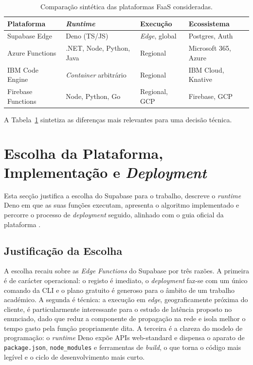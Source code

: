 \documentclass[conference]{IEEEtran}
\begin{document}
\begin{table}[!htbp]
\caption{Comparação sintética das plataformas FaaS consideradas.}
\label{tab:plat}
\centering
\renewcommand{\arraystretch}{1.18}
\footnotesize
\begin{tabular}{@{}p{2.2cm}p{1.9cm}p{1.7cm}p{1.5cm}@{}}
\toprule
\textbf{Plataforma} & \textbf{\textit{Runtime}} & \textbf{Execução} & \textbf{Ecossistema} \\
\midrule
Supabase Edge & Deno (TS/JS) & \textit{Edge}, global & Postgres, Auth \\
Azure Functions & .NET, Node, Python, Java & Regional & Microsoft 365, Azure \\
IBM Code Engine & \textit{Container} arbitrário & Regional & IBM Cloud, Knative \\
Firebase Functions & Node, Python, Go & Regional, GCP & Firebase, GCP \\
\bottomrule
\end{tabular}
\end{table}

A Tabela~\ref{tab:plat} sintetiza as diferenças mais relevantes para uma decisão técnica.

\section{Escolha da Plataforma, Implementação e \textit{Deployment}}
Esta secção justifica a escolha do Supabase para o trabalho, descreve o \textit{runtime} Deno em que as suas funções executam, apresenta o algoritmo implementado e percorre o processo de \textit{deployment} seguido, alinhado com o guia oficial da plataforma \cite{supabasequickstart}.

\subsection{Justificação da Escolha}
A escolha recaiu sobre as \textit{Edge Functions} do Supabase por três razões. A primeira é de carácter operacional: o registo é imediato, o \textit{deployment} faz-se com um único comando da CLI e o plano gratuito é generoso para o âmbito de um trabalho académico. A segunda é técnica: a execução em \textit{edge}, geograficamente próxima do cliente, é particularmente interessante para o estudo de latência proposto no enunciado, dado que reduz a componente de propagação na rede e isola melhor o tempo gasto pela função propriamente dita. A terceira é a clareza do modelo de programação: o \textit{runtime} Deno expõe APIs web-standard e dispensa o aparato de \texttt{package.json}, \texttt{node\_modules} e ferramentas de \textit{build}, o que torna o código mais legível e o ciclo de desenvolvimento mais curto.
\end{document}
